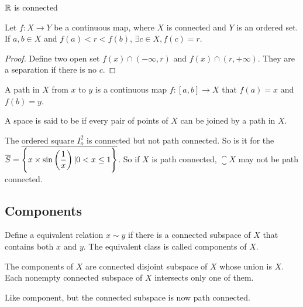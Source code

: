 \begin{theorem}
    $\mathbb{R}$ is connected
\end{theorem}

\begin{theorem}
    Let $f : X \rightarrow Y$ be a continuous map, where $X$ is connected and $Y$ is an ordered set. If $a,b \in X$ and $f(a) < r < f(b)$, $\exists c \in X, f(c) = r$.
\end{theorem}
\begin{proof}
    Define two open set $f(x) \cap (-\infty, r)$ and $f(x) \cap (r, +\infty)$. They are a separation if there is no $c$.
\end{proof}

\begin{definition}
    A path in $X$ from $x$ to $y$ is a continuous map $f: [a,b] \rightarrow X$ that $f(a) = x$ and $f(b) = y$.
    
    A space is said to be  if every pair of points of $X$ can be joined by a path in $X$.
\end{definition}

\begin{example}
    The ordered square $I_o^2$ is connected but not path connected. So is it for the  $\overline{S} = \overline{\set{\displaystyle x \times \sin \left(\frac{1}{x} \right) | 0 < x \leq 1}}$. So if $X$ is path connected, $\closure{X}$ may not be path connected.
\end{example}


\subsection{Components}

\begin{definition}
    Define a equivalent relation $x \sim y$ if there is a connected subspace of $X$ that contains both $x$ and $y$. The equivalent class is called components of $X$.
\end{definition}

\begin{theorem}
The components of $X$ are connected disjoint subspace of $X$ whose union is $X$. Each nonempty connected subspace of $X$ intersects only one of them.    
\end{theorem}

\begin{definition}
    Like component, but the connected subspace is now path connected.
\end{definition}

